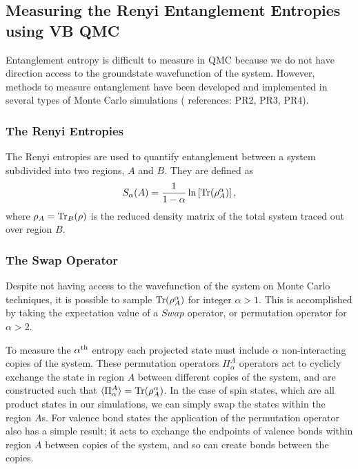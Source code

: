 \documentclass[prb,aps,twocolumn,floatfix,amsmath,amssymb,superscriptaddress,tightenlines]{revtex4}
\begin{document}
\subsection{Measuring the Renyi Entanglement Entropies using VB QMC}
Entanglement entropy is difficult to measure in QMC because we do not have direction access to the groundstate wavefunction of the system.
However, methods to measure entanglement have been developed and implemented in {\color{red} several} types of Monte Carlo simulations ({\color{red} references: PR2, PR3, PR4}).

\subsubsection{The Renyi Entropies}
The Renyi entropies are used to quantify entanglement between a system subdivided into two regions, $A$ and $B$.
They are defined as 
\begin{equation} \label{renyi}
S_{\alpha}(A) = \frac{1}{1-\alpha}\ln \left[ {\rm Tr}(\rho_A^{\alpha}) \right],
\end{equation}
where $\rho_A = {\rm Tr}_B (\rho)$ is the reduced density matrix of the total system traced out over region $B$.\\

\subsubsection{The Swap Operator}
Despite not having access to the wavefunction of the system on Monte Carlo techniques, it is possible to sample ${\rm Tr}(\rho_A^{\alpha})$ for integer $\alpha > 1$.
This is accomplished by taking the expectation value of a $Swap$ operator, %
or permutation operator for $\alpha > 2$.%


To measure the $\alpha^{\rm th}$ entropy each projected state must include $\alpha$ non-interacting copies of the system.
These permutation operators $\Pi_\alpha^A$ operators act to cyclicly exchange the state in region $A$ between different copies of the system, and are constructed such that  $\langle \Pi_\alpha^A \rangle = {\rm Tr}(\rho_A^{\alpha})$.
In the case of spin states, which are all product states in our simulations, we can simply swap the states within the region $A$s.  
For valence bond states the application of the permutation operator also has a simple result; it acts to exchange the endpoints of valence bonds within region $A$ between copies of the system, and so can create bonds between the copies.
\end{document}
